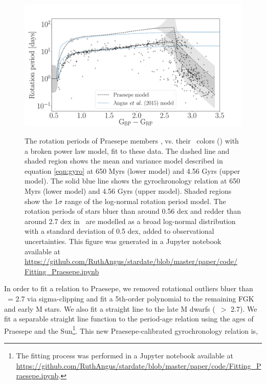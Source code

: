 \begin{figure}
  \caption{
    The rotation periods of Praesepe members \citep{douglas2016},
    vs. their \Gaia\ colors (\gcolor) with a broken power law model, fit to
    these data.
    The dashed line and shaded region shows the mean and variance model
    described in equation \ref{eqn:gyro} at 650 Myrs (lower model) and 4.56
    Gyrs (upper model).
    The solid blue line shows the \citep{angus2015} gyrochronology relation at
    650 Myrs (lower model) and 4.56 Gyrs (upper model).
    Shaded regions show the 1$\sigma$ range of the log-normal rotation period
    model.
    The rotation periods of stars bluer than around 0.56 dex and redder than
    around 2.7 dex in \gcolor\ are modelled as a broad log-normal distribution
    with a standard deviation of 0.5 dex, added to observational
    uncertainties.
    This figure was generated in a Jupyter notebook available at
    \url{https://github.com/RuthAngus/stardate/blob/master/paper/code/Fitting_Praesepe.ipynb}
}
  \centering
    \includegraphics[width=1.1\textwidth]{Praesepe.pdf}
\label{fig:praesepe}
\end{figure}
In order to fit a relation to Praesepe, we removed rotational outliers bluer
than \gcolor\ = 2.7 via sigma-clipping and fit a 5th-order polynomial to the
remaining FGK and early M stars.
We also fit a straight line to the late M dwarfs (\gcolor\ $>$ 2.7).
We fit a separable straight line function to the period-age relation using
the ages of Praesepe and the Sun\footnote{The fitting process was
performed in a Jupyter notebook available at
\url{https://github.com/RuthAngus/stardate/blob/master/paper/code/Fitting_Praesepe.ipynb}.}.
This new Praesepe-calibrated gyrochronology relation is,
